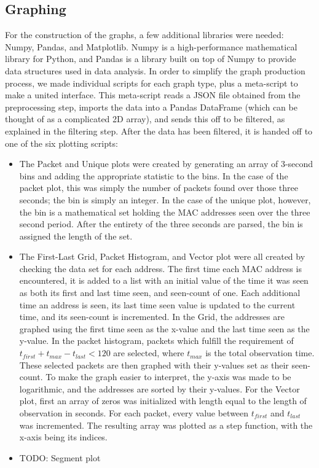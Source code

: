 \documentclass[letterpaper,abstract=on,titlepage=false]{scrreprt}
\begin{document}
    \subsection*{Graphing}
    For the construction of the graphs, a few additional libraries were needed: Numpy, Pandas, and Matplotlib.
    Numpy is a high-performance mathematical library for Python, and Pandas is a library built on top of Numpy to provide data structures used in data analysis.
    In order to simplify the graph production process, we made individual scripts for each graph type, plus a meta-script to make a united interface.
    This meta-script reads a JSON file obtained from the preprocessing step, imports the data into a Pandas DataFrame (which can be thought of as a complicated 2D array), and sends this off to be filtered, as explained in the filtering step.
    After the data has been filtered, it is handed off to one of the six plotting scripts:
    \begin{itemize}
      \item The Packet and Unique plots were created by generating an array of 3-second bins and adding the appropriate statistic to the bins.
      In the case of the packet plot, this was simply the number of packets found over those three seconds; the bin is simply an integer.
      In the case of the unique plot, however, the bin is a mathematical set holding the MAC addresses seen over the three second period.
      After the entirety of the three seconds are parsed, the bin is assigned the length of the set.
    \item The First-Last Grid, Packet Histogram, and Vector plot were all created by checking the data set for each address.
      The first time each MAC address is encountered, it is added to a list with an initial value of the time it was seen as both its first and last time seen, and seen-count of one.
      Each additional time an address is seen, its last time seen value is updated to the current time, and its seen-count is incremented.
      In the Grid, the addresses are graphed using the first time seen as the x-value and the last time seen as the y-value.
      In the packet histogram, packets which fulfill the requirement of \(t_{first} + t_{max} - t_{last} < 120\) are selected, where \(t_{max}\) is the total observation time.
      These selected packets are then graphed with their y-values set as their seen-count.
      To make the graph easier to interpret, the y-axis was made to be logarithmic, and the addresses are sorted by their y-values.
      For the Vector plot, first an array of zeros was initialized with length equal to the length of observation in seconds.
      For each packet, every value between \(t_{first}\) and \(t_{last}\) was incremented.
      The resulting array was plotted as a step function, with the x-axis being its indices.
      \item TODO: Segment plot
    \end{itemize}
\end{document}
